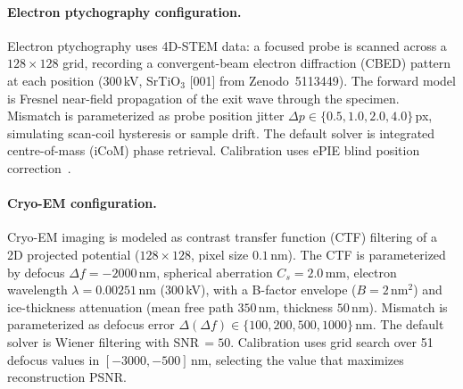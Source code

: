 \paragraph{Electron ptychography configuration.}
Electron ptychography uses 4D-STEM data: a focused probe is scanned across
a $128 \times 128$ grid, recording a convergent-beam electron diffraction
(CBED) pattern at each position (300\,kV, SrTiO$_3$ [001] from
Zenodo~5113449).  The forward model is Fresnel near-field propagation of
the exit wave through the specimen.  Mismatch is parameterized as probe
position jitter $\Delta p \in \{0.5, 1.0, 2.0, 4.0\}$\,px, simulating
scan-coil hysteresis or sample drift.  The default solver is integrated
centre-of-mass (iCoM) phase retrieval.  Calibration uses ePIE blind
position correction~\cite{maiden2009ptychography}.

\paragraph{Cryo-EM configuration.}
\begin{sloppypar}
Cryo-EM imaging is modeled as contrast transfer function (CTF) filtering
of a 2D projected potential ($128 \times 128$, pixel size $0.1$\,nm).  The
CTF is parameterized by defocus $\Delta f = -2000$\,nm, spherical aberration
$C_s = 2.0$\,mm, electron wavelength $\lambda = 0.00251$\,nm (300\,kV),
with a B-factor envelope ($B = 2$\,nm$^2$) and ice-thickness attenuation
(mean free path $350$\,nm, thickness $50$\,nm).  Mismatch is parameterized
as defocus error $\Delta(\Delta f) \in \{100, 200, 500, 1000\}$\,nm.  The
default solver is Wiener filtering with SNR\,$= 50$.  Calibration uses grid
search over 51 defocus values in $[-3000, -500]$\,nm, selecting the value
that maximizes reconstruction PSNR.
\end{sloppypar}

